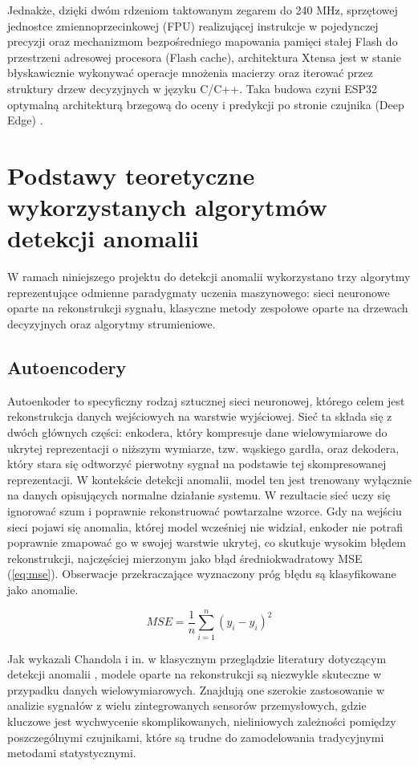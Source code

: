 \documentclass[12pt,twoside]{article}
\begin{document}
Jednakże, dzięki dwóm rdzeniom taktowanym zegarem do 240 MHz, sprzętowej jednostce zmiennoprzecinkowej (FPU) realizującej instrukcje w pojedynczej precyzji oraz mechanizmom bezpośredniego mapowania pamięci stałej Flash do przestrzeni adresowej procesora (Flash cache), architektura Xtensa jest w stanie błyskawicznie wykonywać operacje mnożenia macierzy oraz iterować przez struktury drzew decyzyjnych w języku C/C++. Taka budowa czyni ESP32 optymalną architekturą brzegową do oceny i predykcji po stronie czujnika (Deep Edge) \cite{esp32}.

\section{Podstawy teoretyczne wykorzystanych algorytmów detekcji anomalii}
W ramach niniejszego projektu do detekcji anomalii wykorzystano trzy algorytmy reprezentujące odmienne paradygmaty uczenia maszynowego: sieci neuronowe oparte na rekonstrukcji sygnału, klasyczne metody zespołowe oparte na drzewach decyzyjnych oraz algorytmy strumieniowe.
\subsection{Autoencodery}
Autoenkoder to specyficzny rodzaj sztucznej sieci neuronowej, którego celem jest rekonstrukcja danych wejściowych na warstwie wyjściowej. Sieć ta składa się z dwóch głównych części: enkodera, który kompresuje dane wielowymiarowe do ukrytej reprezentacji o niższym wymiarze, tzw. wąskiego gardła, oraz dekodera, który stara się odtworzyć pierwotny sygnał na podstawie tej skompresowanej reprezentacji. W kontekście detekcji anomalii, model ten jest trenowany wyłącznie na danych opisujących normalne działanie systemu. W rezultacie sieć uczy się ignorować szum i poprawnie rekonstruować powtarzalne wzorce. Gdy na wejściu sieci pojawi się anomalia, której model wcześniej nie widział, enkoder nie potrafi poprawnie zmapować go w swojej warstwie ukrytej, co skutkuje wysokim błędem rekonstrukcji, najczęściej mierzonym jako błąd średniokwadratowy MSE (\ref{eq:mse}). Obserwacje przekraczające wyznaczony próg błędu są klasyfikowane jako anomalie.

\begin{equation}
    MSE = \frac{1}{n} \sum_{i=1}^{n} (y_i - \hat{y}_i)^2
    \label{eq:mse}
\end{equation}

Jak wykazali Chandola i in. w klasycznym przeglądzie literatury dotyczącym detekcji anomalii \cite{anomalysurvey}, modele oparte na rekonstrukcji są niezwykle skuteczne w przypadku danych wielowymiarowych. Znajdują one szerokie zastosowanie w analizie sygnałów z wielu zintegrowanych sensorów przemysłowych, gdzie kluczowe jest wychwycenie skomplikowanych, nieliniowych zależności pomiędzy poszczególnymi czujnikami, które są trudne do zamodelowania tradycyjnymi metodami statystycznymi.
\end{document}
